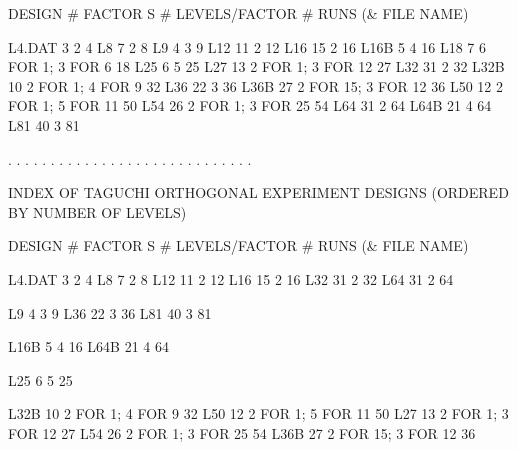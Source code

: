   DESIGN     # FACTOR S    # LEVELS/FACTOR        # RUNS
(& FILE NAME)
 
  L4.DAT         3            2                      4
  L8             7            2                      8
  L9             4            3                      9
  L12           11            2                     12
  L16           15            2                     16
  L16B           5            4                     16
  L18            7            6 FOR  1; 3 FOR   6   18
  L25            6            5                     25
  L27           13            2 FOR  1; 3 FOR  12   27
  L32           31            2                     32
  L32B          10            2 FOR  1; 4 FOR   9   32
  L36           22            3                     36
  L36B          27            2 FOR 15; 3 FOR  12   36
  L50           12            2 FOR  1; 5 FOR  11   50
  L54           26            2 FOR  1; 3 FOR  25   54
  L64           31            2                     64
  L64B          21            4                     64
  L81           40            3                     81
 
. . . . . . . . . . . . . . . . . . . . . . . . . . . . .
 
   INDEX OF TAGUCHI ORTHOGONAL EXPERIMENT DESIGNS
          (ORDERED BY NUMBER OF LEVELS)
 
  DESIGN     # FACTOR S    # LEVELS/FACTOR        # RUNS
(& FILE NAME)
 
  L4.DAT         3            2                      4
  L8             7            2                      8
  L12           11            2                     12
  L16           15            2                     16
  L32           31            2                     32
  L64           31            2                     64
 
  L9             4            3                      9
  L36           22            3                     36
  L81           40            3                     81
 
  L16B           5            4                     16
  L64B          21            4                     64
 
  L25            6            5                     25
 
  L32B          10            2 FOR  1; 4 FOR   9   32
  L50           12            2 FOR  1; 5 FOR  11   50
  L27           13            2 FOR  1; 3 FOR  12   27
  L54           26            2 FOR  1; 3 FOR  25   54
  L36B          27            2 FOR 15; 3 FOR  12   36
 

